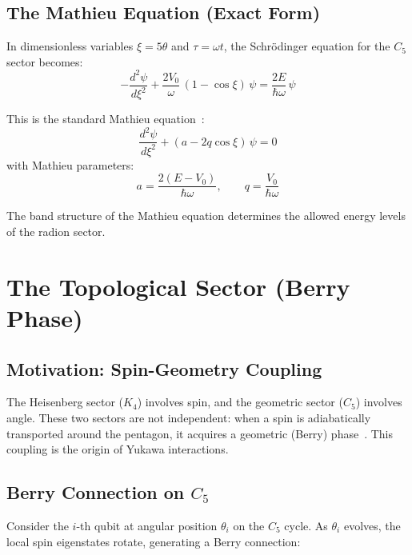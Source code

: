 \documentclass[11pt,a4paper]{article}
\theoremstyle{definition}
\theoremstyle{remark}
\begin{document}
\subsection{The Mathieu Equation (Exact Form)}

In dimensionless variables $\xi = 5\theta$ and $\tau = \omega t$, the Schr\"odinger equation for the $C_5$ sector becomes:
\begin{equation}
-\frac{d^2\psi}{d\xi^2} + \frac{2V_0}{\omega}\,(1 - \cos\xi)\,\psi = \frac{2E}{\hbar\omega}\,\psi
\end{equation}

This is the standard Mathieu equation~\cite{Mathieu1868}:
\begin{equation}
\frac{d^2\psi}{d\xi^2} + (a - 2q\cos\xi)\,\psi = 0
\end{equation}
with Mathieu parameters:
\begin{equation}
a = \frac{2(E - V_0)}{\hbar\omega}, \qquad q = \frac{V_0}{\hbar\omega}
\end{equation}

The band structure of the Mathieu equation determines the allowed energy levels of the radion sector.

\section{The Topological Sector (Berry Phase)}
\label{sec:topo}

\subsection{Motivation: Spin-Geometry Coupling}

The Heisenberg sector ($K_4$) involves spin, and the geometric sector ($C_5$) involves angle. These two sectors are not independent: when a spin is adiabatically transported around the pentagon, it acquires a geometric (Berry) phase~\cite{Berry1984}. This coupling is the origin of Yukawa interactions.

\subsection{Berry Connection on $C_5$}

Consider the $i$-th qubit at angular position $\theta_i$ on the $C_5$ cycle. As $\theta_i$ evolves, the local spin eigenstates rotate, generating a Berry connection:
\end{document}
